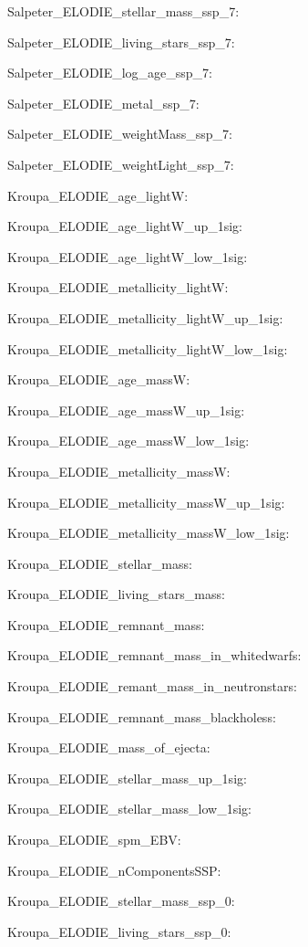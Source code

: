\item Salpeter\_ELODIE\_stellar\_mass\_ssp\_7: 
\item Salpeter\_ELODIE\_living\_stars\_ssp\_7: 
\item Salpeter\_ELODIE\_log\_age\_ssp\_7: 
\item Salpeter\_ELODIE\_metal\_ssp\_7: 
\item Salpeter\_ELODIE\_weightMass\_ssp\_7: 
\item Salpeter\_ELODIE\_weightLight\_ssp\_7: 
\item Kroupa\_ELODIE\_age\_lightW: 
\item Kroupa\_ELODIE\_age\_lightW\_up\_1sig: 
\item Kroupa\_ELODIE\_age\_lightW\_low\_1sig: 
\item Kroupa\_ELODIE\_metallicity\_lightW: 
\item Kroupa\_ELODIE\_metallicity\_lightW\_up\_1sig: 
\item Kroupa\_ELODIE\_metallicity\_lightW\_low\_1sig: 
\item Kroupa\_ELODIE\_age\_massW: 
\item Kroupa\_ELODIE\_age\_massW\_up\_1sig: 
\item Kroupa\_ELODIE\_age\_massW\_low\_1sig: 
\item Kroupa\_ELODIE\_metallicity\_massW: 
\item Kroupa\_ELODIE\_metallicity\_massW\_up\_1sig: 
\item Kroupa\_ELODIE\_metallicity\_massW\_low\_1sig: 
\item Kroupa\_ELODIE\_stellar\_mass: 
\item Kroupa\_ELODIE\_living\_stars\_mass: 
\item Kroupa\_ELODIE\_remnant\_mass: 
\item Kroupa\_ELODIE\_remnant\_mass\_in\_whitedwarfs: 
\item Kroupa\_ELODIE\_remant\_mass\_in\_neutronstars: 
\item Kroupa\_ELODIE\_remnant\_mass\_blackholess: 
\item Kroupa\_ELODIE\_mass\_of\_ejecta: 
\item Kroupa\_ELODIE\_stellar\_mass\_up\_1sig: 
\item Kroupa\_ELODIE\_stellar\_mass\_low\_1sig: 
\item Kroupa\_ELODIE\_spm\_EBV: 
\item Kroupa\_ELODIE\_nComponentsSSP: 
\item Kroupa\_ELODIE\_stellar\_mass\_ssp\_0: 
\item Kroupa\_ELODIE\_living\_stars\_ssp\_0: 
